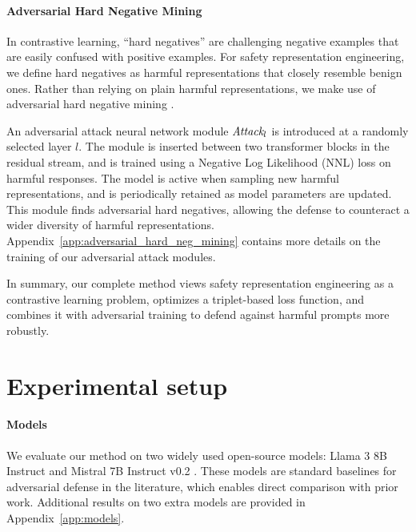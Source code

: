 \documentclass[11pt]{article}
\begin{document}
\paragraph{Adversarial Hard Negative Mining}
In contrastive learning, ``hard negatives'' are challenging negative examples that are easily confused with positive examples.
For safety representation engineering, we define hard negatives as harmful representations that closely resemble benign ones.
Rather than relying on plain harmful representations, we make use of adversarial hard negative mining \citep{8517355}.


An adversarial attack neural network module $\textit{Attack}_l$ is introduced at a randomly selected layer $l$.
The module is inserted between two transformer blocks in the residual stream, and is trained
using a Negative Log Likelihood (NNL) loss on harmful responses. The model is active when sampling
new harmful representations, and is periodically retained as model parameters are updated.
This module finds adversarial hard negatives, allowing the defense to counteract a wider diversity of harmful representations.
Appendix~\ref{app:adversarial_hard_neg_mining} contains more details on the training of our adversarial attack modules.

In summary, our complete method views safety representation engineering as a contrastive learning problem, optimizes a triplet-based loss function, and combines it with adversarial training to defend against harmful prompts more robustly.

\section{Experimental setup}


\paragraph{Models}
We evaluate our method on two widely used open-source models: Llama 3 8B Instruct \citep{grattafiori2024llama3herdmodels}
and Mistral 7B Instruct v0.2 \citep{jiang2023mistral7b}. These models are standard baselines for adversarial defense in the literature, which enables direct comparison with prior work.
Additional results on two extra models are provided in Appendix~\ref{app:models}.
\end{document}
